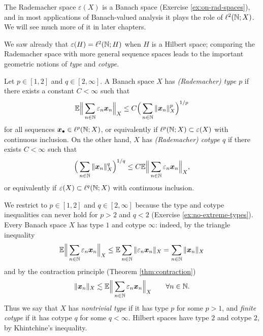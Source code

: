 The Rademacher space $\varepsilon(X)$ is a Banach space (Exercise \ref{ex:on-rad-spaces}), and in most applications of Banach-valued analysis it plays the role of $\ell^2(\mathbb{N};X)$.
We will see much more of it in later chapters.

We saw already that $\varepsilon(H) = \ell^2(\mathbb{N};H)$ when $H$ is a Hilbert space; comparing the Rademacher space with more general sequence spaces leads to the important geometric notions of \emph{type} and \emph{cotype}.

\begin{defn}
  Let $p \in [1,2]$ and $q \in [2,\infty]$.
  A Banach space $X$ has \emph{(Rademacher) type $p$} if there exists a constant $C < \infty$ such that
  \begin{equation*}
    \mathbb{E} \Big\| \sum_{n \in \mathbb{N}} \varepsilon_{n} \bm{x}_{n} \Big\|_{X} \leq C \Big( \sum_{n \in \mathbb{N}} \|\bm{x}_{n}\|_{X}^{p} \Big)^{1/p}
  \end{equation*}
  for all sequences $\bm{x}_{\bullet} \in \ell^{p}(\mathbb{N};X)$, or equivalently if $\ell^{p}(\mathbb{N};X) \subset \varepsilon(X)$ with continuous inclusion.
  On the other hand, $X$ has \emph{(Rademacher) cotype $q$} if there exists $C < \infty$ such that
  \begin{equation*}
    \Big( \sum_{n \in \mathbb{N}} \|\bm{x}_{n}\|_{X}^{q} \Big)^{1/q} \leq C \mathbb{E} \Big\| \sum_{n \in \mathbb{N}} \varepsilon_{n} \bm{x}_{n} \Big\|_{X} ,
  \end{equation*}
  or equivalently if $\varepsilon(X) \subset \ell^{q}(\mathbb{N};X)$ with continuous inclusion.
\end{defn}

We restrict to $p \in [1,2]$ and $q \in [2,\infty]$ because the type and cotype inequalities can never hold for $p > 2$ and $q < 2$ (Exercise \ref{ex:no-extreme-types}).
Every Banach space $X$ has type $1$ and cotype $\infty$: indeed, by the triangle inequality
\begin{equation*}
  \mathbb{E} \Big\| \sum_{n \in \mathbb{N}} \varepsilon_{n} \bm{x}_{n} \Big\|_{X} \leq \mathbb{E} \sum_{n \in \mathbb{N}} \|\varepsilon_{n} \bm{x}_{n}\|_{X} = \sum_{n \in \mathbb{N}} \|\bm{x}_{n}\|_{X}
\end{equation*}
and by the contraction principle (Theorem \ref{thm:contraction})
\begin{equation*}
  \|\bm{x}_{n}\|_{X} \lesssim \mathbb{E} \Big\| \sum_{n \in \mathbb{N}} \varepsilon_{n} \bm{x}_{n} \Big\|_{X} \qquad \forall n \in \mathbb{N}.
\end{equation*}
Thus we say that $X$ has \emph{nontrivial type} if it has type $p$ for some $p > 1$, and \emph{finite cotype} if it has cotype $q$ for some $q < \infty$.
Hilbert spaces have type $2$ and cotype $2$, by Khintchine's inequality.

